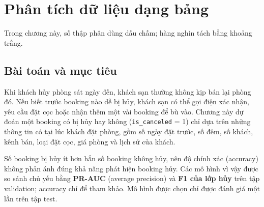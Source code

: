 \chapter{Phân tích dữ liệu dạng bảng}
\label{chap:tabular}
\sloppy %

Trong chương này, số thập phân dùng dấu chấm; hàng nghìn tách bằng khoảng trắng.

\section{Bài toán và mục tiêu}
Khi khách hủy phòng sát ngày đến, khách sạn thường không kịp bán lại phòng đó. Nếu biết trước booking nào dễ bị hủy,
khách sạn có thể gọi điện xác nhận, yêu cầu đặt cọc hoặc nhận thêm một vài booking để bù vào.
Chương này dự đoán một booking có bị hủy hay không (\texttt{is\_canceled} = 1) chỉ dựa trên những thông tin có tại lúc khách đặt phòng,
gồm số ngày đặt trước, số đêm, số khách, kênh bán, loại đặt cọc, giá phòng và lịch sử của khách.

Số booking bị hủy ít hơn hẳn số booking không hủy, nên độ chính xác (accuracy) không phản ánh đúng khả năng phát hiện booking hủy.
Các mô hình vì vậy được so sánh chủ yếu bằng \textbf{PR-AUC} (average precision) và \textbf{F1 của lớp hủy} trên tập validation;
accuracy chỉ để tham khảo. Mô hình được chọn chỉ được đánh giá một lần trên tập test.

